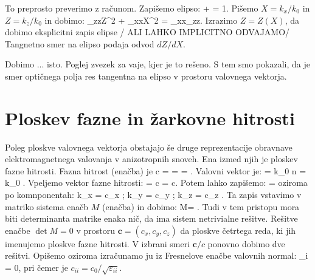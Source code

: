 To preprosto preverimo z računom. Zapišemo elipso:
\beq
{}+  = 1.
\eeq
Pišemo $X = k_x/k_0$ in $Z = k_z/k_0$
in dobimo:
\beq
\varepsilon_{zz}Z^2 + \varepsilon_{xx}X^2 = \varepsilon_{xx}\varepsilon_{zz}.
\eeq
Izrazimo $Z= Z(X)$, da dobimo eksplicitni zapis elipse / ALI LAHKO IMPLICITNO ODVAJAMO/
Tangnetno smer na elipso podaja odvod $dZ/dX$.  

Dobimo ... isto. Poglej zvezek za vaje, kjer je to rešeno. S tem smo pokazali, da 
je smer optičnega polja res tangentna na elipso v prostoru valovnega vektorja. 


\section{Ploskev fazne in žarkovne hitrosti}
Poleg ploskve valovnega vektorja obstajajo še druge reprezentacije obravnave
elektromagnetnega valovanja v anizotropnih snoveh. Ena izmed njih je ploskev
fazne hitrosti. Fazna hitrost (enačba) je 
\beq
c =  =  = .
\eeq
Valovni vektor je:
\beq
{} = k_0 n  = k_0 .
\eeq
Vpeljemo vektor fazne hitrosti:
\beq
{} = c = c.
\eeq
Potem lahko zapišemo:
\beq
{} = 
\eeq
oziroma po komnponentah:
\beq
k_x = c_x ; \qquad k_y = c_y ; \qquad k_z = c_z . 
\eeq
Ta zapis vstavimo v matriko sistema enačb $M$ (enačba) in dobimo:
\beq
M=
\!\!.
\eeq
Tudi v tem pristopu mora biti determinanta matrike enaka nič, da ima sistem netrivialne rešitve.
Rešitve enačbe $\det M = 0$ v prostoru $\mathbf{c} = (c_x, c_y, c_z)$ da ploskve četrtega reda, ki 
jih imenujemo ploskve fazne hitrosti. V izbrani smeri $\mathbf{c}/c$ ponovno dobimo dve rešitvi. Opišemo
oziroma izračunamo ju iz Fresnelove enačbe valovnih normal:
\beq
\sum_i  = 0,
\eeq
pri čemer je $c_{ii} = c_0 /\sqrt{\varepsilon_{ii}}$. 

